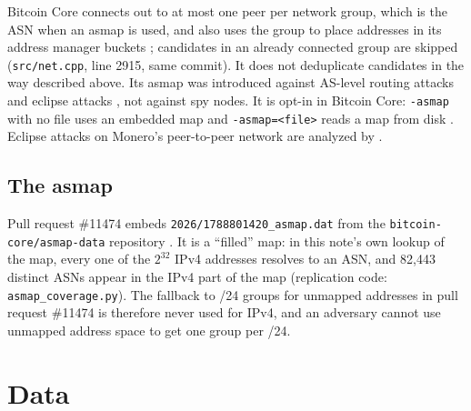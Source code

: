 \documentclass[english]{mrl}
\theoremstyle{plain}
\begin{document}
Bitcoin Core connects out to at most one peer per network group, which is the ASN when an asmap is used, and also uses the group to place addresses in its address manager buckets \cite{BitcoinInit,BitcoinPR16702}; candidates in an already connected group are skipped (\texttt{src/net.cpp}, line 2915, same commit). It does not deduplicate candidates in the way described above. Its asmap was introduced against AS-level routing attacks and eclipse attacks \cite{Apostolaki2017,Tran2020,Heilman2015}, not against spy nodes. It is opt-in in Bitcoin Core: \texttt{-asmap} with no file uses an embedded map and \texttt{-asmap=<file>} reads a map from disk \cite{BitcoinInit,BitcoinPR28792}. Eclipse attacks on Monero's peer-to-peer network are analyzed by \cite{Shi2025}.

\subsection{The asmap}

Pull request \#11474 embeds \texttt{2026/1788801420\_asmap.dat} from the \texttt{bitcoin-core/asmap-data} repository \cite{AsmapData,MoneroPR11474}. It is a ``filled'' map: in this note's own lookup of the map, every one of the $2^{32}$ IPv4 addresses resolves to an ASN, and 82,443 distinct ASNs appear in the IPv4 part of the map (replication code: \texttt{asmap\_coverage.py}). The fallback to /24 groups for unmapped addresses in pull request \#11474 is therefore never used for IPv4, and an adversary cannot use unmapped address space to get one group per /24.

\section{Data}
\end{document}
